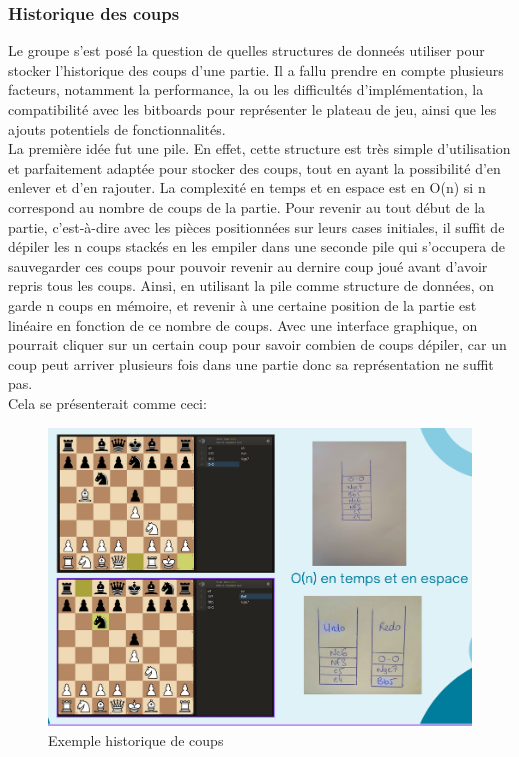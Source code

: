 \documentclass{article}
\begin{document}
\subsubsection{Historique des coups}
\par Le groupe s'est posé la question de quelles structures de donneés utiliser pour stocker l'historique des coups d'une
partie. Il a fallu prendre en compte plusieurs facteurs, notamment la performance, la ou les difficultés d'implémentation,
la compatibilité avec les bitboards pour représenter le plateau de jeu, ainsi que les ajouts potentiels de fonctionnalités.
\\La première idée fut une pile. En effet, cette structure est très simple d'utilisation et parfaitement adaptée pour stocker
des coups, tout en ayant la possibilité d'en enlever et d'en rajouter. La complexité en temps et en espace est en O(n) si n 
correspond au nombre de coups de la partie. Pour revenir au tout début de la partie, c'est-à-dire avec les pièces positionnées
sur leurs cases initiales, il suffit de dépiler les n coups stackés en les empiler dans une seconde pile qui s'occupera de sauvegarder
ces coups pour pouvoir revenir au dernire coup joué avant d'avoir repris tous les coups. Ainsi, en utilisant la pile comme structure 
de données, on garde n coups en mémoire, et revenir à une certaine position de la partie est linéaire en fonction de ce nombre de coups.
Avec une interface graphique, on pourrait cliquer sur un certain coup pour savoir combien de coups dépiler, car un coup peut arriver
plusieurs fois dans une partie donc sa représentation ne suffit pas.\\
Cela se présenterait comme ceci:\\
\begin{figure}[h]
    \caption{Exemple historique de coups}
    \centering
    \includegraphics[width=\textwidth,height=\textheight,keepaspectratio]{pile-historique-coups}
\end{figure}
\end{document}

